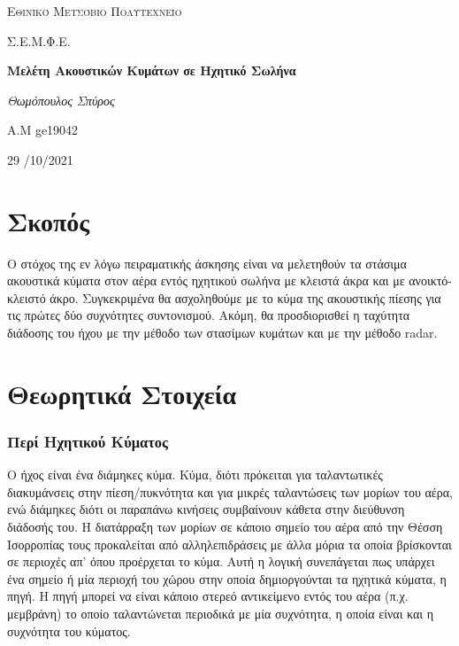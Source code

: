 \documentclass[a4paper]{article}
\begin{document}
\begin{titlepage}			%
	\centering
	{\scshape\LARGE Εθινικό Μετσόβιο Πολυτεχνείο\par}
	{\scshape \LARGE Σ.Ε.Μ.Φ.Ε.\par}
	\vspace{1cm}
	{\huge\bfseries Μελέτη Ακουστικών Κυμάτων σε Ηχητικό Σωλήνα\par}
	\vspace{1cm}
	{\Large\itshape Θωμόπουλος Σπύρος\par}		%
	
	{\large A.M ge19042 \hfill \\}%
	\vspace{1cm}
	{\large 29 /10/2021\par}
\end{titlepage}


\newpage 


\section*{Σκοπός}
Ο στόχος της εν λόγω πειραματικής άσκησης είναι να μελετηθούν τα στάσιμα ακουστικά κύματα στον αέρα εντός ηχητικού σωλήνα με κλειστά άκρα και με ανοικτό-κλειστό άκρο. Συγκεκριμένα θα ασχοληθούμε με το κύμα της ακουστικής πίεσης για τις πρώτες δύο συχνότητες συντονισμού. Ακόμη, θα προσδιορισθεί η ταχύτητα διάδοσης του ήχου με την μέθοδο των στασίμων κυμάτων και με την μέθοδο radar.

\section*{Θεωρητικά Στοιχεία}
\subsubsection*{Περί Ηχητικού Κύματος}
Ο ήχος είναι ένα διάμηκες κύμα. Κύμα, διότι πρόκειται για ταλαντωτικές διακυμάνσεις στην πίεση/πυκνότητα και για μικρές ταλαντώσεις των μορίων του αέρα, ενώ διάμηκες διότι οι παραπάνω κινήσεις συμβαίνουν κάθετα στην διεύθυνση διάδοσής του. 
Η διατάρραξη των μορίων σε κάποιο σημείο του αέρα από την Θέσση Ισορροπίας τους προκαλείται από αλληλεπιδράσεις με άλλα μόρια τα οποία βρίσκονται σε περιοχές απ' όπου προέρχεται το κύμα. Αυτή η λογική συνεπάγεται πως υπάρχει ένα σημείο ή μία περιοχή του χώρου στην οποία δημιοργούνται τα ηχητικά κύματα, η πηγή. Η πηγή μπορεί να είναι κάποιο στερεό αντικείμενο εντός του αέρα (π.χ. μεμβράνη) το οποίο ταλαντώνεται περιοδικά με μία συχνότητα, η οποία είναι και η συχνότητα του κύματος. 
\end{document}
